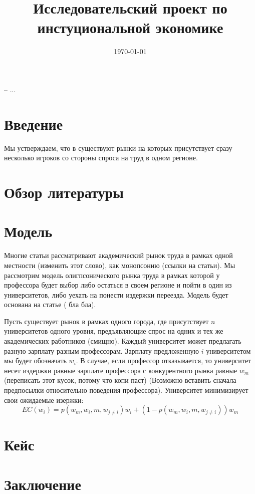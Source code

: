 \documentclass[a4paper, 12pt]{article}
\title{Исследовательский проект по инстуциональной экономике}
\date{\today}
\theoremstyle{definition}
\theoremstyle{plain}
\begin{document}
\maketitle

-- ...

\section{Введение}
Мы устверждаем, что в существуют рынки на которых присутствует сразу несколько игроков со стороны спроса на труд в одном регионе. 
\section{Обзор литературы}

\section{Модель}

Многие статьи рассматривают академический рынок труда в рамках одной местности (изменить этот слово), как монопсонию (ссылки на статьи). Мы рассмотрим модель олигпсонического рынка труда в рамках которой у профессора будет выбор либо остаться в своем регионе и пойти в один из университетов, либо уехать на понести издержки переезда. Модель будет основана на статье ( бла бла). 

Пусть существует рынок в рамках одного города, где присутствует $n$ университетов одного уровня, предъявляющие спрос на одних и тех же академических работников (смищно). Каждый университет может предлагать разную зарплату разным профессорам. Зарплату предложенную $i$ университетом мы будет обозначать $w_i$. В случае, если профессор отказывается, то университет несет издержки равные зарплате профессора с конкурентного рынка равные $w_m$ (переписать этот кусок, потому что копи паст) (Возможно вставить сначала предпосылки относительно поведения профессора). Университет минимизирует свои ожидаемые изержки: 
\[
EC(w_i) = p(w_m, w_i, m, w_{j \neq i})w_i + (1 - p(w_m, w_i, m, w_{j \neq i}))w_m
\]




\section{Кейс}

\section{Заключение}
\end{document}

